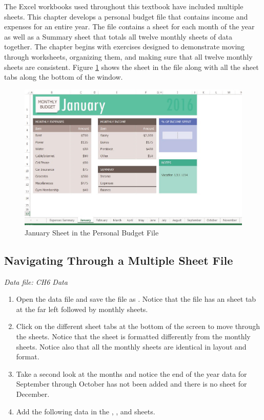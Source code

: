 The Excel workbooks used throughout this textbook have included multiple sheets. This chapter develops a personal budget file that contains income and expenses for an entire year. The file contains a sheet for each month of the year as well as a Summary sheet that totals all twelve monthly sheets of data together. The chapter begins with exercises designed to demonstrate moving through worksheets, organizing them, and making sure that all twelve monthly sheets are consistent. Figure \ref{06:fig01} shows the  sheet in the  file along with all the sheet tabs along the bottom of the window.

\begin{figure}[H]
	\centering
	\includegraphics[width=\maxwidth{.95\linewidth}]{gfx/ch06_fig01}
	\caption{January Sheet in the Personal Budget File}
	\label{06:fig01}
\end{figure}

\subsection{Navigating Through a Multiple Sheet File}

\textit{Data file: CH6 Data}

\begin{enumerate}
	\item Open the data file  and save the file as . Notice that the file has an  sheet tab at the far left followed by monthly sheets.
	\item Click on the different sheet tabs at the bottom of the screen to move through the sheets. Notice that the  sheet is formatted differently from the monthly sheets. Notice also that all the monthly sheets are identical in layout and format.
	\item Take a second look at the months and notice the end of the year data for September through October has not been added and there is no sheet for December. 
	\item Add the following data in the , , and  sheets.
\end{enumerate}

